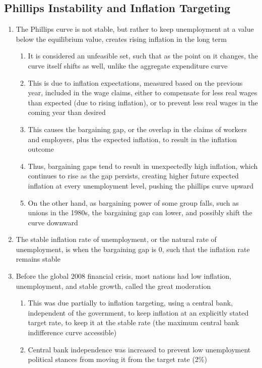 \documentclass[11 pt, twoside]{article}
\begin{document}
\subsection{Phillips Instability and Inflation Targeting}
\begin{enumerate}
\item The Phillips curve is not stable, but rather to keep unemployment at a value below the equilibrium value, creates rising inflation in the long term
\begin{enumerate}
\item It is considered an unfeasible set, such that as the point on it changes, the curve itself shifts as well, unlike the aggregate expenditure curve
\item This is due to inflation expectations, measured based on the previous year, included in the wage claims, either to compensate for less real wages than expected (due to rising inflation), or to prevent less real wages in the coming year than desired
\item This causes the bargaining gap, or the overlap in the claims of workers and employers, plus the expected inflation, to result in the inflation outcome
\item Thus, bargaining gaps tend to result in unexpectedly high inflation, which continues to rise as the gap persists, creating higher future expected inflation at every unemployment level, pushing the phillips curve upward
\item On the other hand, as bargaining power of some group falls, such as unions in the 1980s, the bargaining gap can lower, and possibly shift the curve downward
\end{enumerate}
\item The stable inflation rate of unemployment, or the natural rate of unemployment, is when the bargaining gap is 0, such that the inflation rate remains stable
\item Before the global 2008 financial crisis, most nations had low inflation, unemployment, and stable growth, called the great moderation
\begin{enumerate}
\item This was due partially to inflation targeting, using a central bank, independent of the government, to keep inflation at an explicitly stated target rate, to keep it at the stable rate (the maximum central bank indifference curve accessible)
\item Central bank independence was increased to prevent low unemployment political stances from moving it from the target rate (2\%)

\end{enumerate}
\end{enumerate}
\end{document}
